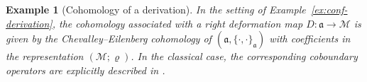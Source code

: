 \documentclass[a4paper,11pt]{article}
\def\Vs{\mathfrak{a}}
\def\Ws{\mathfrak{b}}
\def\Mod{\mathcal{M}}
\def\rep{\varrho}
\def\la{\lambda}
\numberwithin{equation}{section}
\newtheorem{example}[theorem]{Example}
\begin{document}
\begin{example}[Cohomology of a  derivation]\label{ex:coh conf-derivation}
In the setting of Example~\ref{ex:conf-derivation}, the cohomology associated with a right deformation map
$D:\Vs\to\Mod$ is given by the Chevalley--Eilenberg cohomology of
$(\Vs,\{\cdot,\cdot\}_\Vs)$ with coefficients in the representation
$(\Mod;\rep)$. In the classical case, the corresponding coboundary
operators are explicitly described in \cite{TFS}. 


\end{example}
 
\end{document}

